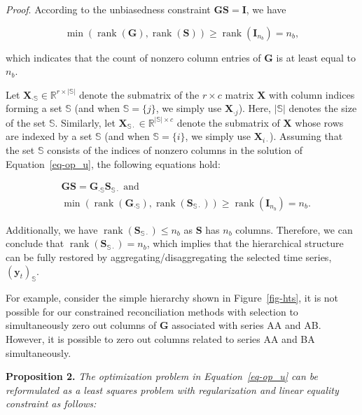\documentclass[11pt,a4paper,]{article}
\begin{document}
\emph{Proof}. According to the unbiasedness constraint
\(\boldsymbol{GS}=\boldsymbol{I}\), we have

\[
\min \left(\operatorname{rank}(\boldsymbol{G}), \operatorname{rank}(\boldsymbol{S})\right) \geq \operatorname{rank}(\boldsymbol{I}_{n_b})=n_b,
\]

which indicates that the count of nonzero column entries of
\(\boldsymbol{G}\) is at least equal to \(n_b\).

Let
\(\boldsymbol{X}_{\cdot \mathbb{S}} \in \mathbb{R}^{r \times |\mathbb{S}|}\)
denote the submatrix of the \(r \times c\) matrix \(\boldsymbol{X}\)
with column indices forming a set \(\mathbb{S}\) (and when
\(\mathbb{S} = \{j\}\), we simply use \(\boldsymbol{X}_{\cdot j}\)).
Here, \(|\mathbb{S}|\) denotes the size of the set \(\mathbb{S}\).
Similarly, let
\(\boldsymbol{X}_{\mathbb{S}\cdot} \in \mathbb{R}^{|\mathbb{S}| \times c}\)
denote the submatrix of \(\boldsymbol{X}\) whose rows are indexed by a
set \(\mathbb{S}\) (and when \(\mathbb{S} = \{i\}\), we simply use
\(\boldsymbol{X}_{i\cdot}\)). Assuming that the set \(\mathbb{S}\)
consists of the indices of nonzero columns in the solution of
Equation~\ref{eq-op_u}, the following equations hold:

\[
\begin{aligned}
& \boldsymbol{G}\boldsymbol{S} = \boldsymbol{G}_{\cdot \mathbb{S}}\boldsymbol{S}_{\mathbb{S}\cdot} \text{ and } \\
& \min \left(\operatorname{rank}(\boldsymbol{G}_{\cdot \mathbb{S}}), \operatorname{rank}(\boldsymbol{S}_{\mathbb{S}\cdot})\right) \geq \operatorname{rank}(\boldsymbol{I}_{n_b})=n_b.
\end{aligned}
\]

Additionally, we have
\(\operatorname{rank}(\boldsymbol{S}_{\mathbb{S}\cdot}) \leq n_b\) as
\(\boldsymbol{S}\) has \(n_b\) columns. Therefore, we can conclude that
\(\operatorname{rank}(\boldsymbol{S}_{\mathbb{S}\cdot}) = n_b\), which
implies that the hierarchical structure can be fully restored by
aggregating/disaggregating the selected time series,
\((\boldsymbol{y}_{t})_{\mathbb{S}}\).

For example, consider the simple hierarchy shown in
Figure~\ref{fig-hts}, it is not possible for our constrained
reconciliation methods with selection to simultaneously zero out columns
of \(\boldsymbol{G}\) associated with series AA and AB. However, it is
possible to zero out columns related to series AA and BA simultaneously.

\textbf{Proposition 2.} \emph{The optimization problem in
Equation~\ref{eq-op_u} can be reformulated as a least squares problem
with regularization and linear equality constraint as follows:}
\end{document}
